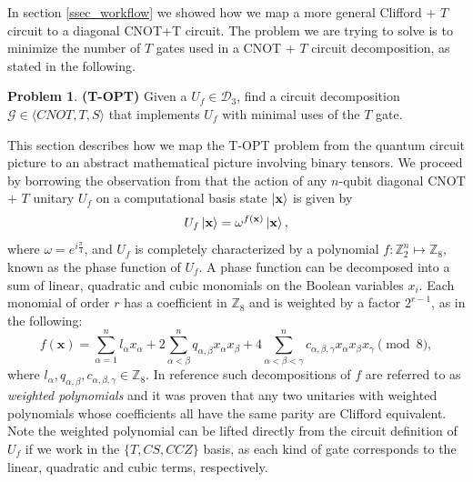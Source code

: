 \documentclass[notitlepage]{article}
\theoremstyle{definition}
\newtheorem{definition}{Definition}[section]
\theoremstyle{problem}
\newtheorem{problem}{Problem}[section]
\theoremstyle{lemma}
\begin{document}
In section \ref{ssec_workflow} we showed how we map a more general Clifford + $T$ circuit to a diagonal CNOT+T circuit. The problem we are trying to solve is to minimize the number of $T$ gates used in a CNOT + $T$ circuit decomposition, as stated in the following.
\begin{problem}{\textbf{(T-OPT)}}
	Given a $U_f \in \mathcal{D}_3$, find a circuit decomposition $\mathcal{G} \in \langle CNOT, T, S \rangle$ that implements $U_f$ with minimal uses of the $T$ gate.
\end{problem}
This section describes how we map the T-OPT problem from the quantum circuit picture to an abstract mathematical picture involving binary tensors. We proceed by borrowing the observation from \cite{5_Amy_2013,6_Amy_2013} that the action of any $n$-qubit diagonal CNOT + $T$ unitary $U_f$ on a computational basis state $\left\vert{\mathbf{x}}\right\rangle$ is given by
\begin{equation}
\label{eq_U_f}
U_f \left\vert{\mathbf{x}}\right\rangle = \omega^{f(\mathbf{x})}\left\vert{\mathbf{x}}\right\rangle,
\end{equation}
where $\omega = e^{i \frac{\pi}{4}}$, and $U_f$ is completely characterized by a polynomial $f: \mathbb{Z}_2^n \mapsto \mathbb{Z}_8$, known as the phase function of $U_f$. A phase function can be decomposed into a sum of linear, quadratic and cubic monomials on the Boolean variables $x_i$. Each monomial of order $r$ has a coefficient in $\mathbb{Z}_8$ and is weighted by a factor $2^{r-1}$, as in the following:
\begin{equation}
\label{eq_wp}
f(\mathbf{x}) = \sum_{\alpha=1}^{n}l_{\alpha}x_\alpha + 2\sum_{\alpha<\beta}^{n} q_{\alpha,\beta}x_\alpha x_\beta + 4\sum_{\alpha<\beta<\gamma}^{n}c_{\alpha,\beta,\gamma}x_\alpha x_\beta x_\gamma \pmod{8},
\end{equation}
where $l_{\alpha},q_{\alpha,\beta},c_{\alpha,\beta,\gamma} \in \mathbb{Z}_8$.
In reference \cite{4_Campbell_2017} such decompositions of $f$ are referred to as \emph{weighted polynomials} and it was proven that any two unitaries with weighted polynomials whose coefficients all have the same parity are Clifford equivalent. Note the weighted polynomial can be lifted directly from the circuit definition of $U_f$ if we work in the $\{T, CS, CCZ\}$ basis, as each kind of gate corresponds to the linear, quadratic and cubic terms, respectively.
\end{document}
